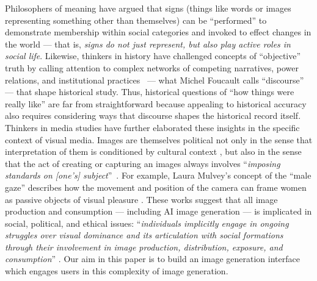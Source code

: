 Philosophers of meaning have argued that signs (things like words or images representing something other than themselves) can be ``performed'' to demonstrate membership within social categories \cite{butler1990gender, hall1990cultural, hall1997representation} and invoked to effect changes in the world \cite{austin1956performative, austin1962how} --- that is, \textit{signs do not just represent, but also play active roles in social life}. 
Likewise, thinkers in history have challenged concepts of ``objective'' truth by calling attention to complex networks of competing narratives, power relations, and institutional practices~\cite{certeau1988writing, white1973metahistory} --- what Michel Foucault calls ``discourse''~\cite{foucault1972archaeology} --- that shape historical study.
Thus, historical questions of ``how things were really like'' are far from straightforward because appealing to historical accuracy also requires considering ways that discourse shapes the historical record itself.
Thinkers in media studies have further elaborated these insights in the specific context of visual media.
Images are themselves political not only in the sense that interpretation of them is conditioned by cultural context \cite{barthes1981camera}, but also in the sense that the act of creating or capturing an images always involves ``\textit{imposing standards on [one's] subject}''~\cite{sontag1977on}. 
For example, Laura Mulvey's concept of the ``male gaze'' describes how the movement and position of the camera can frame women as passive objects of visual pleasure \cite{mulvey1975visual}. 
These works suggest that all image production and consumption --- including AI image generation --- is implicated in social, political, and ethical issues: ``\textit{individuals implicitly engage in ongoing struggles over visual dominance and its articulation with social formations through their involvement in image production, distribution, exposure, and consumption}'' \cite{herrieetal2024democratization}. 
Our aim in this paper is to build an image generation interface which engages users in this complexity of image generation.


